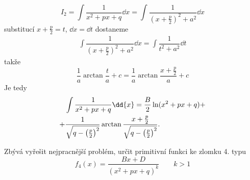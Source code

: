       \begin{equation}
        I_2 =\int\dfrac{1}{x^2+px+q}\dd{x} 
            =\int{\dfrac{1}{\left(x+\frac{p}{2}\right)^2 + a^2}}\dd{x}
      \end{equation}
      substitucí \(x + \frac{p}{2} = t\), \(\dd{x} = \dd{t}\) dostaneme 
      \begin{gather*}
        \int{\dfrac{1}{\left(x+\frac{p}{2}\right)^2 + a^2}}\dd{x} = 
        \int{\dfrac{1}{t^2+a^2}}\dd{t}
      \end{gather*}
      takže
      \begin{equation*}
        \dfrac{1}{a}\arctan\dfrac{t}{a} + c = \dfrac{1}{a}\arctan\dfrac{x + \frac{p}{2}}{a} + c 
      \end{equation*}
      Je tedy
      \begin{align}
          &\int\dfrac{1}{x^2+px+q}\dd{x} = \frac{B}{2}\ln(x^2+px+q) +              \notag     \\ 
        + &\frac{1}{\sqrt{q-\left(\frac{p}{2}\right)^2}}
                \arctan\frac{x+\frac{p}{2}}{\sqrt{q-\left(\frac{p}{2}\right)^2}}.  \label{mai:eq171}
      \end{align}
     

      Zbývá vyřešit nejpracnější problém, určit primitivní funkci ke zlomku 4. typu 
        \begin{equation}\label{mai:eq172}
          \boxed{f_4(x) = \frac{Bx + D}{(x^2+px+q)^k}} \qquad k>1
        \end{equation}
      

